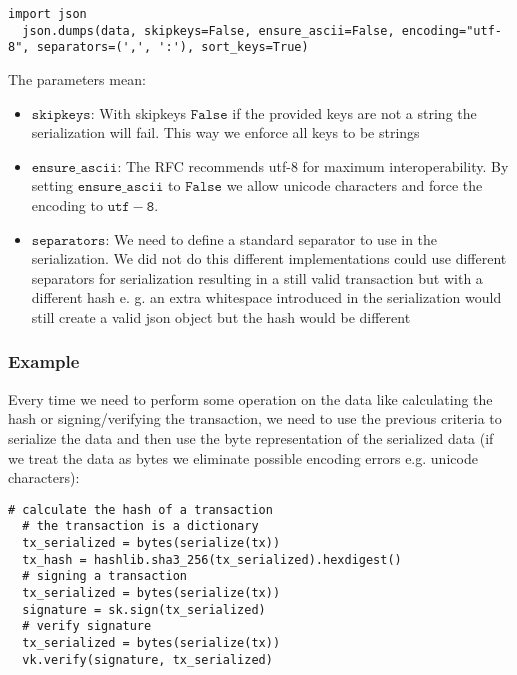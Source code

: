 \begin{minipage}{\linewidth}
  \begin{lstlisting}[style=python]
  import json 
  json.dumps(data, skipkeys=False, ensure_ascii=False, encoding="utf-8", separators=(',', ':'), sort_keys=True)\end{lstlisting}
\end{minipage}

\noindent The parameters mean: 
\begin{itemize}
 \item $\mathtt{skipkeys}$: With skipkeys $\mathtt{False}$ if the provided keys are not a string the serialization will fail. This way we enforce all keys to be strings
 \item $\mathtt{ensure\_ascii}$: The RFC recommends utf-8 for maximum interoperability. By setting $\mathtt{ensure\_ascii}$ to $\mathtt{False}$ we allow unicode characters and force the encoding to $\mathtt{utf-8}$. 
 \item $\mathtt{separators}$: We need to define a standard separator to use in the serialization. We did not do this different implementations could use different separators for serialization resulting in a still valid transaction but with a different hash e. g. an extra whitespace introduced in the serialization would still create a valid json object but the hash would be different
\end{itemize}

\subsubsection{Example}
Every time we need to perform some operation on the data like calculating the hash or signing/verifying the transaction, we need to use the previous criteria to serialize the data and then use the byte representation of the serialized data (if we treat the data as bytes we eliminate possible encoding errors e.g. unicode characters):

\begin{minipage}{\linewidth}
  \begin{lstlisting}[style=python]
  # calculate the hash of a transaction 
  # the transaction is a dictionary 
  tx_serialized = bytes(serialize(tx)) 
  tx_hash = hashlib.sha3_256(tx_serialized).hexdigest() 
  # signing a transaction 
  tx_serialized = bytes(serialize(tx)) 
  signature = sk.sign(tx_serialized) 
  # verify signature 
  tx_serialized = bytes(serialize(tx)) 
  vk.verify(signature, tx_serialized)\end{lstlisting}
\end{minipage}
